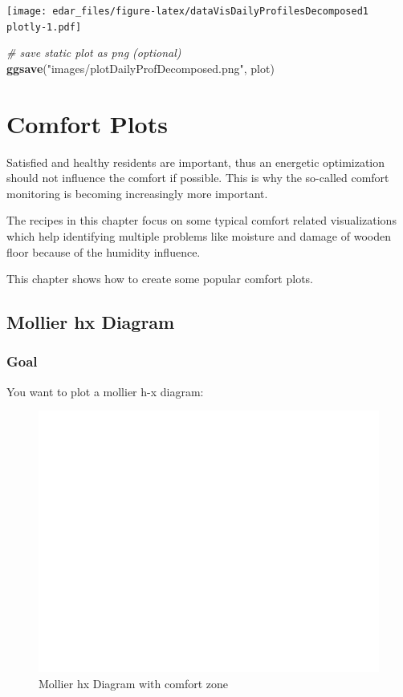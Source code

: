 \documentclass[
  a4paperpaper,
]{book}
\newenvironment{Shaded}{\begin{snugshade}}{\end{snugshade}}
\newcommand{\CommentTok}[1]{\textcolor[rgb]{0.56,0.35,0.01}{\textit{#1}}}
\newcommand{\KeywordTok}[1]{\textcolor[rgb]{0.13,0.29,0.53}{\textbf{#1}}}
\newcommand{\NormalTok}[1]{#1}
\newcommand{\StringTok}[1]{\textcolor[rgb]{0.31,0.60,0.02}{#1}}
\let\oldShaded\Shaded
\let\endoldShaded\endShaded
\renewenvironment{Shaded}{\footnotesize\oldShaded}{\endoldShaded}
\begin{document}
\texttt{[image: edar\_files/figure-latex/dataVisDailyProfilesDecomposed1 plotly-1.pdf]}

\begin{Shaded}
\begin{Highlighting}[]
\CommentTok{# save static plot as png (optional)}
\KeywordTok{ggsave}\NormalTok{(}\StringTok{"images/plotDailyProfDecomposed.png"}\NormalTok{, plot)}
\end{Highlighting}
\end{Shaded}

\hypertarget{comfort-plots}{%
\chapter{Comfort Plots}\label{comfort-plots}}

Satisfied and healthy residents are important, thus an energetic optimization should not influence the comfort if possible. This is why the so-called comfort monitoring is becoming increasingly more important.

The recipes in this chapter focus on some typical comfort related visualizations which help identifying multiple problems like moisture and damage of wooden floor because of the humidity influence.

This chapter shows how to create some popular comfort plots.

\newpage

\hypertarget{mollier-hx-diagram}{%
\section{Mollier hx Diagram}\label{mollier-hx-diagram}}

\hypertarget{goal-12}{%
\subsection{Goal}\label{goal-12}}

You want to plot a mollier h-x diagram:

\begin{figure}
\includegraphics[width=0.7\linewidth]{images/comfortMollierHx} \caption{Mollier hx Diagram with comfort zone}\label{fig:unnamed-chunk-21}
\end{figure}
\end{document}
